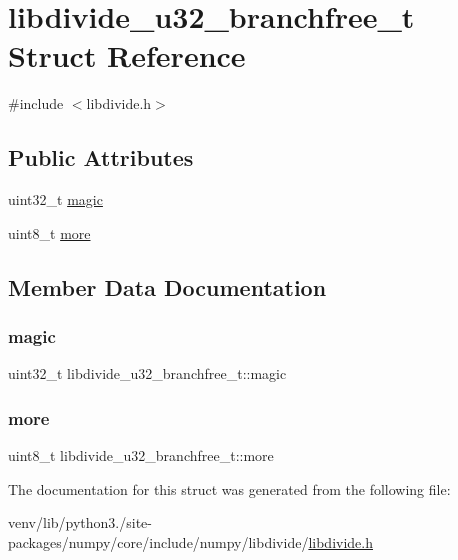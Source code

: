 \hypertarget{structlibdivide__u32__branchfree__t}{}\section{libdivide\+\_\+u32\+\_\+branchfree\+\_\+t Struct Reference}
\label{structlibdivide__u32__branchfree__t}


{\ttfamily \#include $<$libdivide.\+h$>$}

\subsection*{Public Attributes}
\begin{DoxyCompactItemize}
\item 
uint32\+\_\+t \hyperlink{structlibdivide__u32__branchfree__t_a85d7072f21191edd50e7e523da8a3f6c}{magic}
\item 
uint8\+\_\+t \hyperlink{structlibdivide__u32__branchfree__t_a8766e758d5d54c37415f184665bf70a8}{more}
\end{DoxyCompactItemize}


\subsection{Member Data Documentation}
\mbox{\label{structlibdivide__u32__branchfree__t_a85d7072f21191edd50e7e523da8a3f6c}} 
\subsubsection{\texorpdfstring{magic}{magic}}
{\footnotesize\ttfamily uint32\+\_\+t libdivide\+\_\+u32\+\_\+branchfree\+\_\+t\+::magic}

\mbox{\label{structlibdivide__u32__branchfree__t_a8766e758d5d54c37415f184665bf70a8}} 
\subsubsection{\texorpdfstring{more}{more}}
{\footnotesize\ttfamily uint8\+\_\+t libdivide\+\_\+u32\+\_\+branchfree\+\_\+t\+::more}



The documentation for this struct was generated from the following file\+:\begin{DoxyCompactItemize}
\item 
venv/lib/python3./site-\/packages/numpy/core/include/numpy/libdivide/\hyperlink{libdivide_8h}{libdivide.\+h}\end{DoxyCompactItemize}
